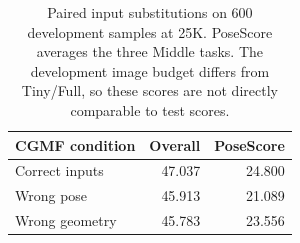 \begin{table}[t]
\centering\small
\begin{tabular}{@{}lrr@{}}
\toprule
CGMF condition & Overall & PoseScore \\
\midrule
Correct inputs & 47.037 & 24.800 \\
Wrong pose & 45.913 & 21.089 \\
Wrong geometry & 45.783 & 23.556 \\
\bottomrule
\end{tabular}
\caption{Paired input substitutions on 600 development samples at 25K. PoseScore averages the three Middle tasks. The development image budget differs from Tiny/Full, so these scores are not directly comparable to test scores.}
\label{tab:interventions}
\end{table}

